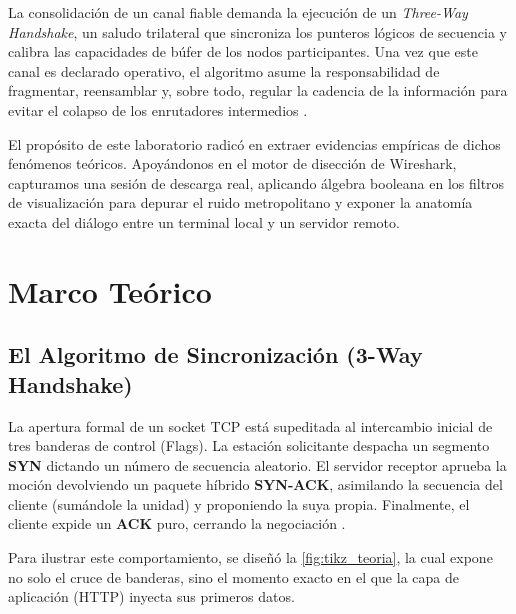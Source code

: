 \documentclass[conference]{IEEEtran}
\begin{document}
La consolidación de un canal fiable demanda la ejecución de un \textit{Three-Way Handshake}, un saludo trilateral que sincroniza los punteros lógicos de secuencia y calibra las capacidades de búfer de los nodos participantes. Una vez que este canal es declarado operativo, el algoritmo asume la responsabilidad de fragmentar, reensamblar y, sobre todo, regular la cadencia de la información para evitar el colapso de los enrutadores intermedios \cite{forouzan2013}.

El propósito de este laboratorio radicó en extraer evidencias empíricas de dichos fenómenos teóricos. Apoyándonos en el motor de disección de Wireshark, capturamos una sesión de descarga real, aplicando álgebra booleana en los filtros de visualización para depurar el ruido metropolitano y exponer la anatomía exacta del diálogo entre un terminal local y un servidor remoto.

\section{Marco Teórico}
\subsection{El Algoritmo de Sincronización (3-Way Handshake)}
La apertura formal de un socket TCP está supeditada al intercambio inicial de tres banderas de control (Flags). La estación solicitante despacha un segmento \textbf{SYN} dictando un número de secuencia aleatorio. El servidor receptor aprueba la moción devolviendo un paquete híbrido \textbf{SYN-ACK}, asimilando la secuencia del cliente (sumándole la unidad) y proponiendo la suya propia. Finalmente, el cliente expide un \textbf{ACK} puro, cerrando la negociación \cite{tanenbaum2021}. 

Para ilustrar este comportamiento, se diseñó la \autoref{fig:tikz_teoria}, la cual expone no solo el cruce de banderas, sino el momento exacto en el que la capa de aplicación (HTTP) inyecta sus primeros datos.
\end{document}
